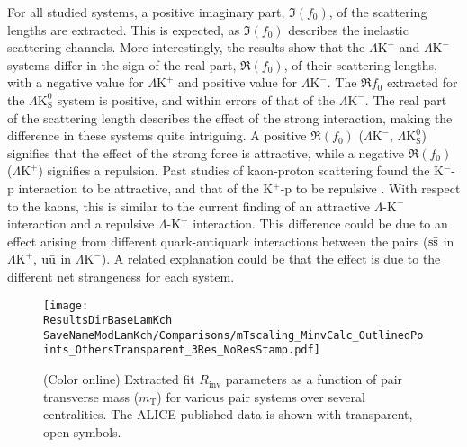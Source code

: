 \documentclass[ALICE,manyauthors]{cernphprep}
\newcommand{\ResultsDirBaseLamKch}{/home/jesse/Analysis/FemtoAnalysis/Results/Results_cLamcKch_20180505/}
\newcommand{\MomRes}{_MomResCrctn}%
\newcommand{\NonFlatBgdLamKch}{_NonFlatBgdCrctnLamK0LinearLamKchPolynomial}
\newcommand{\ResNum}{_3Res}
\newcommand{\PrimMaxDecay}{_PrimMaxDecay10fm}
\newcommand{\ResMethod}{_UsingXiDataAndCoulombOnly}
\newcommand{\ParamFixAndShareLamKch}{_ShareLam_Dualie_ShareLam_ShareRadii}
\newcommand{\SaveNameModLamKch}{\MomRes\NonFlatBgdLamKch\ResNum\PrimMaxDecay\ResMethod\ParamFixAndShareLamKch}
\newcommand{\mt}{$m_{\mathrm{T}}$\xspace}
\newcommand{\Lam}{$\Lambda$\xspace}
\newcommand{\KchP}{$\mathrm{K^{+}}$\xspace}
\newcommand{\KchM}{$\mathrm{K^{-}}$\xspace}
\newcommand{\LamKchP}{$\Lambda\mathrm{K^{+}}$\xspace}
\newcommand{\LamKchM}{$\Lambda\mathrm{K^{-}}$\xspace}
\newcommand{\LamKs}{$\Lambda\mathrm{K^{0}_{S}}$\xspace}
\begin{document}
For all studied systems, a positive imaginary part, $\Im(f_{0})$, of the scattering lengths are extracted. 
This is expected, as $\Im(f_{0})$ describes the inelastic scattering channels.
More interestingly, the results show that the \LamKchP and \LamKchM systems differ in the sign of the real part, $\Re(f_{0})$, of their scattering lengths, with a negative value for \LamKchP and positive value for \LamKchM.
The $\Re f_{0}$ extracted for the \LamKs system is positive, and within errors of that of the \LamKchM. 
The real part of the scattering length describes the effect of the strong interaction, making the difference in these systems quite intriguing.
A positive $\Re(f_{0})$ (\LamKchM, \LamKs) signifies that the effect of the strong force is attractive, while a negative $\Re(f_{0})$ (\LamKchP) signifies a repulsion.
Past studies of kaon-proton scattering found the K$^{-}$-p interaction to be attractive, and that of the K$^{+}$-p to be repulsive \cite{Humphrey:1962zz, Hadjimichef:2002xe, Ikeda:2012au}.
With respect to the kaons, this is similar to the current finding of an attractive \Lam-\KchM interaction and a repulsive \Lam-\KchP interaction.
This difference could be due to an effect arising from different quark-antiquark interactions between the pairs ($\rm s\bar{s}$ in \LamKchP, $\rm u\bar{u}$ in \LamKchM).
A related explanation could be that the effect is due to the different net strangeness for each system.


\begin{figure}[h]
  \centering
  \texttt{[image: \\ResultsDirBaseLamKch\\SaveNameModLamKch/Comparisons/mTscaling\_MinvCalc\_OutlinedPoints\_OthersTransparent\_3Res\_NoResStamp.pdf]}
  \caption[\mt Scaling of Radii: 3 Residuals in Fit]
  {
  (Color online) Extracted fit $R_{\mathrm{inv}}$ parameters as a function of pair transverse mass (\mt) for various pair systems over several centralities. 
  The ALICE published data \cite{Adam:2015vja} is shown with transparent, open symbols.
  }
  \label{fig:mTScalingOfRadii_3Res}
\end{figure}
\end{document}
